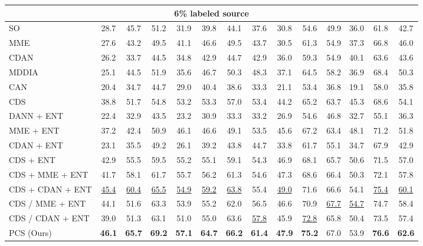 \documentclass[final]{cvpr}
\begin{document}
\begin{table*}[]
{\begin{threeparttable}
\begin{tabular}{l|c|c|c|c|c|c|c|c|c|c|c|c|c}
 \multicolumn{14}{c}{\textbf{6\% labeled source}} \\ \midrule
SO & 28.7 & 45.7 & 51.2 & 31.9 & 39.8 & 44.1 & 37.6 & 30.8 & 54.6 & 49.9 & 36.0 & 61.8 & 42.7 \\
MME~\cite{saito2019semi} & 27.6 & 43.2 & 49.5 & 41.1 & 46.6 & 49.5 & 43.7 & 30.5 & 61.3 & 54.9 & 37.3 & 66.8 & 46.0 \\
CDAN~\cite{long2018conditional} & 26.2 & 33.7 & 44.5 & 34.8 & 42.9 & 44.7 & 42.9 & 36.0 & 59.3 & 54.9 & 40.1 & 63.6 & 43.6 \\
MDDIA~\cite{jiang2020implicit} & 25.1 & 44.5 & 51.9 & 35.6 & 46.7 & 50.3 & 48.3 & 37.1 & 64.5 & 58.2 & 36.9 & 68.4 & 50.3 \\
CAN~\cite{kang2019contrastive} & 20.4 & 34.7 & 44.7 & 29.0 & 40.4 & 38.6 & 33.3 & 21.1 & 53.4 & 36.8 & 19.1 & 58.0 & 35.8 \\
CDS~\cite{kim2020cross} & 38.8 & 51.7 & 54.8 & 53.2 & 53.3 & 57.0 & 53.4 & 44.2 & 65.2 & 63.7 & 45.3 & 68.6 & 54.1 \\
\midrule
DANN + ENT~\cite{ganin2016domain} & 22.4 & 32.9 & 43.5 & 23.2 & 30.9 & 33.3 & 33.2 & 26.9 & 54.6 & 46.8 & 32.7 & 55.1 & 36.3 \\
MME + ENT & 37.2 & 42.4 & 50.9 & 46.1 & 46.6 & 49.1 & 53.5 & 45.6 & 67.2 & 63.4 & 48.1 & 71.2 & 51.8 \\
CDAN + ENT & 23.1 & 35.5 & 49.2 & 26.1 & 39.2 & 43.8 & 44.7 & 33.8 & 61.7 & 55.1 & 34.7 & 67.9 & 42.9 \\
CDS + ENT & 42.9 & 55.5 & 59.5 & 55.2 & 55.1 & 59.1 & 54.3 & 46.9 & 68.1 & 65.7 & 50.6 & 71.5 & 57.0 \\
CDS + MME + ENT & 41.7 & 58.1 & 61.7 & 55.7 & 56.2 & 61.3 & 54.6 & 47.3 & 68.6 & 66.4 & 50.3 & 72.1 & 57.8 \\
CDS + CDAN + ENT & \underline{45.4} & \underline{60.4} & \underline{65.5} & \underline{54.9} & \underline{59.2} & \underline{63.8} & 55.4 & \underline{49.0} & 71.6 & 66.6 & 54.1 & \underline{75.4} & \underline{60.1} \\
CDS / MME + ENT & 44.1 & 51.6 & 63.3 & 53.9 & 55.2 & 62.0 & 56.5 & 46.6 & 70.9 & \underline{67.7} & \underline{54.7} & 74.7 & 58.4 \\
CDS / CDAN + ENT & 39.0 & 51.3 & 63.1 & 51.0 & 55.0 & 63.6 & \underline{57.8} & 45.9 & \underline{72.8} & 65.8 & 50.4 & 73.5 & 57.4 \\
 \hline
PCS (Ours) & \textbf{46.1} & \textbf{65.7} & \textbf{69.2} & \textbf{57.1} & \textbf{64.7} & \textbf{66.2} & \textbf{61.4} & \textbf{47.9} & \textbf{75.2} & 67.0 & 53.9 & \textbf{76.6} & \textbf{62.6} \\

\end{tabular}
\end{threeparttable}}
\end{table*}
\end{document}
